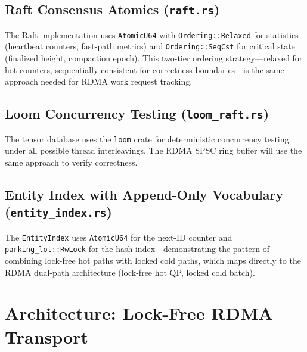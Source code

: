 \documentclass[11pt,letterpaper]{article}
\begin{document}
\subsection{Raft Consensus Atomics (\texttt{raft.rs})}

The Raft implementation uses \texttt{AtomicU64} with \texttt{Ordering::Relaxed} for statistics (heartbeat counters, fast-path metrics) and \texttt{Ordering::SeqCst} for critical state (finalized height, compaction epoch). This two-tier ordering strategy---relaxed for hot counters, sequentially consistent for correctness boundaries---is the same approach needed for RDMA work request tracking.

\subsection{Loom Concurrency Testing (\texttt{loom\_raft.rs})}

The tensor database uses the \texttt{loom} crate for deterministic concurrency testing under all possible thread interleavings. The RDMA SPSC ring buffer will use the same approach to verify correctness.

\subsection{Entity Index with Append-Only Vocabulary (\texttt{entity\_index.rs})}

The \texttt{EntityIndex} uses \texttt{AtomicU64} for the next-ID counter and \texttt{parking\_lot::RwLock} for the hash index---demonstrating the pattern of combining lock-free hot paths with locked cold paths, which maps directly to the RDMA dual-path architecture (lock-free hot QP, locked cold batch).

\section{Architecture: Lock-Free RDMA Transport}
\end{document}
